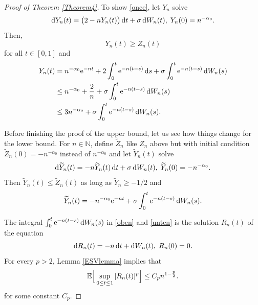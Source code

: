 \documentclass[sn-mathphys-num]{sn-jnl}
\theoremstyle{definition}
\newcommand{\scr}[1]{\mathscr #1}
\numberwithin{equation}{section} \theoremstyle{remark}
\renewcommand{\d}{\hbox{d}}
\def\N{\mathbb N} \def\kk{\kappa} \def\m{{\bf m}}
\def\d{\text{\rm{d}}} \def\bb{\beta} \def\aa{\alpha} \def\D{\scr D}
\def\e{\text{\rm{e}}}
\def\P{\mathbb P}
\newcommand{\1}{\mathbbm{1}}
\renewcommand{\tilde}{\widetilde}
\begin{document}
\begin{proof}[Proof of Theorem \ref{Theorem4}]
To show \eqref{once}, let $Y_n$ solve 
$$
\d Y_n(t)=\big(2-nY_n(t)\big)\,\d t +\sigma\,\d W_n(t),\;Y_n(0)=n^{-\alpha_0}.
$$
 Then, 
\begin{equation}\label{ugl}
Y_n(t) \geq Z_n(t)
\end{equation}
for all $t \in [0,1]$ and
\begin{align}\label{oben}
Y_n(t)&=n^{-\alpha_0}\e^{-nt}+ 2\int_0^t\e^{-n(t-s)}\,\d s+\sigma \int_0^t\e^{-n(t-s)}\,\d W_n(s) \nonumber \\
&\leq n^{-\alpha_0}+\frac 2n +\sigma \int_0^t\e^{-n(t-s)}\,\d W_n(s) \nonumber \\
&\leq 3n^{-\alpha_0} +\sigma \int_0^t\e^{-n(t-s)}\,\d W_n(s).
\end{align}

Before finishing the proof of the upper bound, let us see how things change for the lower bound. For $n \in \N$, define $\tilde Z_n$ like $Z_n$ above but with initial condition $\tilde Z_n(0)=-n^{-\alpha_0}$ instead of $n^{-\alpha_0}$ and let $\tilde Y_n(t)$ solve
$$
\d \tilde Y_n(t)=-n\tilde Y_n(t) \,\d t+\sigma \,\d W_n(t),\;\tilde Y_n(0)=-n^{-\alpha_0}.
$$
Then $\tilde Y_n(t)\leq \tilde Z_n(t)$ as long as $\tilde Y_n\geq -1/2$ and
\begin{equation}\label{unten}
\tilde Y_n(t)=-n^{-\alpha_0}\e^{-nt}+\sigma \int_0^t\e^{-n(t-s)}\,\d W_n(s).
\end{equation}


The  integral $ \int_0^t\e^{-n(t-s)}\,\d W_n(s)$ in \eqref{oben} and \eqref{unten} is the solution $R_n(t)$ of the equation
$$
\d R_n(t)=-n\,\d t +\d W_n(t),\; R_n(0)=0.
$$
For every $p>2$,  Lemma \ref{ESVlemma} implies that
\begin{equation}\label{Rn}
\mathbb E \Big[\sup_{0\leq t \leq 1}|R_n(t)|^p\Big]\leq C_p n^{1-\frac p2}. 
\end{equation}
for some constant $C_p$.



\end{proof}
\end{document}
